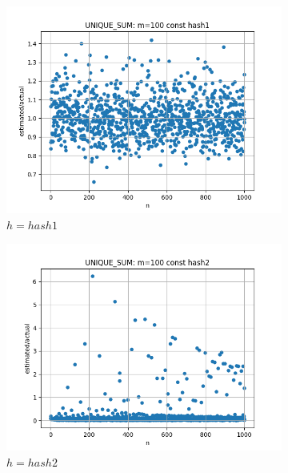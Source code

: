 \documentclass{article}
\begin{document}
    \begin{figure}[H]
        \begin{subfigure}{0.6\textwidth}
            \centering
            \includegraphics[width=\linewidth]{sum/zad1_hash1_const.png}
            \caption{$h = hash1$}
        \end{subfigure}
        \begin{subfigure}{0.6\textwidth}
            \centering
            \includegraphics[width=\linewidth]{sum/zad1_hash2_const.png}
            \caption{$h = hash2$}
        \end{subfigure}
        \begin{subfigure}{0.6\textwidth}
            \centering

\end{subfigure}
\end{figure}
\end{document}
